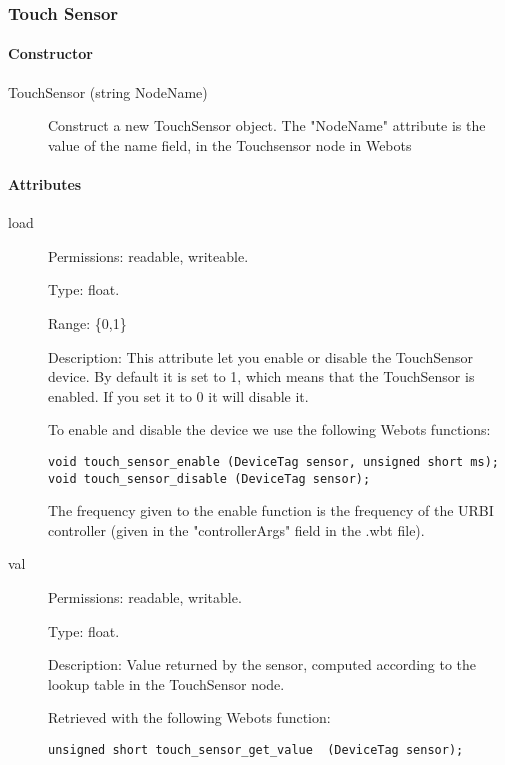 \subsubsection{Touch Sensor}
\label{webots.uobjects.robotdevices.touchsensor}%

\paragraph{Constructor}
\label{webots.uobjects.robotdevices.touchsensor.constructor}%

\noindent
\begin{description}
\item[{TouchSensor (string NodeName)}]            Construct a new TouchSensor object. The "NodeName" attribute is the value
          of the name field, in the Touchsensor node in Webots

\end{description}

\paragraph{Attributes}
\label{webots.uobjects.robotdevices.touchsensor.attributes}%

\noindent
\begin{description}
\item[{load}]     Permissions: readable, writeable.


  Type: float.


  Range: \{0,1\}


  Description: This attribute let you enable or disable the
  TouchSensor device.  By default it is set to 1, which means that the
  TouchSensor is enabled. If you set it to 0 it will disable it.


  To enable and disable the device we use the following Webots
  functions:


\begin{lstlisting}[firstnumber=1,]
void touch_sensor_enable (DeviceTag sensor, unsigned short ms);
void touch_sensor_disable (DeviceTag sensor);
\end{lstlisting}

          The frequency given to the enable function is the frequency of the
          URBI controller (given in the "controllerArgs" field in the .wbt file).

\item[{val}]             Permissions: readable, writable.


  Type: float.


  Description: Value returned by the sensor, computed according to the
  lookup table in the TouchSensor node.


          Retrieved with the following Webots function:


\begin{lstlisting}[firstnumber=1,]
unsigned short touch_sensor_get_value  (DeviceTag sensor);
\end{lstlisting}
\end{description}

